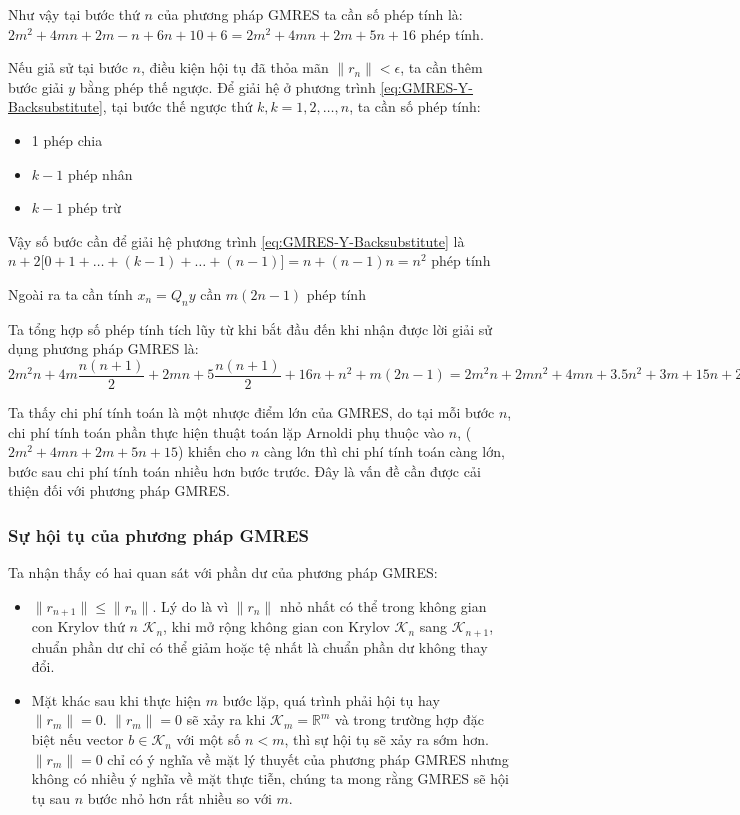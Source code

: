\documentclass[14pt, a4paper]{article}
\numberwithin{equation}{section}
\numberwithin{algorithm}{section}
\numberwithin{figure}{section}
\numberwithin{dl}{section}
\numberwithin{md}{section}
\numberwithin{bd}{section}
\numberwithin{dn}{section}
\numberwithin{hq}{section}
\begin{document}
Như vậy tại bước thứ $n$ của phương pháp GMRES ta cần số phép tính là: $2m^2+4mn+2m-n + 6n+10 + 6=2m^2+4mn+2m+5n+16$ phép tính.

Nếu giả sử tại bước $n$, điều kiện hội tụ đã thỏa mãn $\lVert r_n \rVert < \epsilon$, ta cần thêm bước giải $y$ bằng phép thế ngược. Để giải hệ ở phương trình \ref{eq:GMRES-Y-Backsubstitute}, tại bước thế ngược thứ $k, k=1,2,\dots,n$, ta cần số phép tính:
\begin{itemize}
    \item 1 phép chia
    \item $k-1$ phép nhân
    \item $k-1$ phép trừ
\end{itemize}

Vậy số bước cần để giải hệ phương trình \ref{eq:GMRES-Y-Backsubstitute} là $n + 2\lbrack 0 + 1 + \dots + (k-1) + \dots + (n-1)\rbrack=n+(n-1)n=n^2$ phép tính

Ngoài ra ta cần tính $x_n = Q_n y$ cần $m(2n-1)$ phép tính

Ta tổng hợp số phép tính tích lũy từ khi bắt đầu đến khi nhận được lời giải sử dụng phương pháp GMRES là: $2m^2 n + 4m\dfrac{n(n+1)}{2}+2mn + 5\dfrac{n(n+1)}{2}+16n+n^2+m(2n-1)=2m^2 n + 2mn^2+4mn+3.5n^2+3m+15n+2.5 \sim \mathcal{O}(2m^2n+ 2mn^2)$

Ta thấy chi phí tính toán là một nhược điểm lớn của GMRES, do tại mỗi bước $n$, chi phí tính toán phần thực hiện thuật toán lặp Arnoldi phụ thuộc vào $n$, ($2m^2+4mn+2m+5n+15$) khiến cho $n$ càng lớn thì chi phí tính toán càng lớn, bước sau chi phí tính toán nhiều hơn bước trước. Đây là vấn đề cần được cải thiện đối với phương pháp GMRES.

\subsubsection{Sự hội tụ của phương pháp GMRES} \label{GMRES-Convergence}

Ta nhận thấy có hai quan sát với phần dư của phương pháp GMRES:

\begin{itemize}
    \item $ \lVert r_{n+1} \rVert \leq \lVert r_{n} \rVert $. Lý do là vì $\lVert r_n \rVert$ nhỏ nhất có thể trong không gian con Krylov thứ $n$ $\mathcal{K}_n$, khi mở rộng không gian con Krylov $\mathcal{K}_n$ sang $\mathcal{K}_{n+1}$, chuẩn phần dư chỉ có thể giảm hoặc tệ nhất là chuẩn phần dư không thay đổi.
    \item Mặt khác sau khi thực hiện $m$ bước lặp, quá trình phải hội tụ hay $\lVert r_m \rVert=0$. $\lVert r_m \rVert = 0$ sẽ xảy ra khi $\mathcal{K}_m = \mathbb{R}^m$ và trong trường hợp đặc biệt nếu vector $b \in \mathcal{K}_n$ với một số $n < m$, thì sự hội tụ sẽ xảy ra sớm hơn. $\lVert r_m \rVert = 0$ chỉ có ý nghĩa về mặt lý thuyết của phương pháp GMRES nhưng không có nhiều ý nghĩa về mặt thực tiễn, chúng ta mong rằng GMRES sẽ hội tụ sau $n$ bước nhỏ hơn rất nhiều so với $m$.
\end{itemize}
\end{document}
